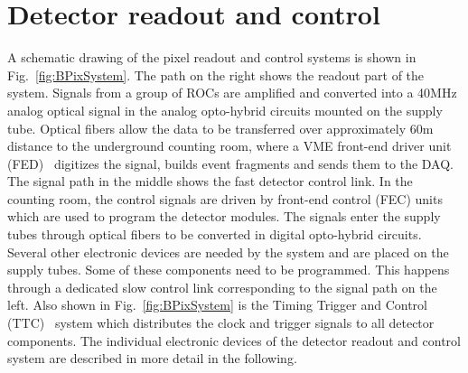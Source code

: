 
\section{Detector readout and control}\label{sec:BPix_DAQ}

A schematic drawing of the pixel readout and control systems is shown in Fig.~\ref{fig:BPixSystem}.
The path on the right shows the readout part of the system.
Signals from a group of ROCs are amplified and converted into a 40\unit{MHz} analog optical signal in the analog opto-hybrid circuits mounted on the supply tube.
Optical fibers allow the data to be transferred over approximately 60\unit{m} distance to the underground counting room, where a VME front-end driver unit (FED)~\cite{Pernicka:1091743} digitizes the signal, builds event fragments and sends them to the DAQ.
The signal path in the middle shows the fast detector control link.
In the counting room, the control signals are driven by front-end control (FEC) units~\cite{Gill:921198} which are used to program the detector modules.
The signals enter the supply tubes through optical fibers to be converted in digital opto-hybrid circuits.
Several other electronic devices are needed by the system and are placed on the supply tubes.
Some of these components need to be programmed. This happens through a dedicated slow control link corresponding to the signal path on the left.
Also shown in Fig.~\ref{fig:BPixSystem} is the Timing Trigger and Control (TTC)~\cite{Taylor:592719} system which distributes the clock and trigger signals to all detector components.
The individual electronic devices of the detector readout and control system are described in more detail in the following.


